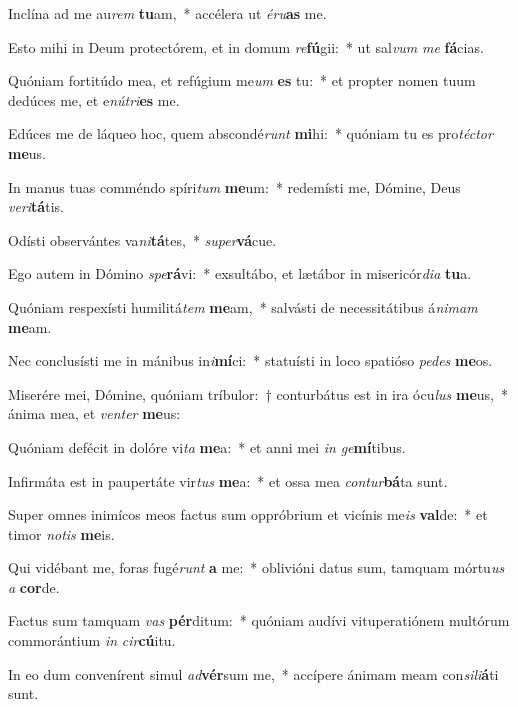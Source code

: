 \item Inclína ad me au\textit{rem} \textbf{tu}am,~* accélera ut \textit{é}\textit{ru}\textbf{as} me.
\item Esto mihi in Deum protectórem, et in domum \textit{re}\textbf{fú}gii:~* ut sal\textit{vum} \textit{me} \textbf{fá}cias.
\item Quóniam fortitúdo mea, et refúgium me\textit{um} \textbf{es} tu:~* et propter nomen tuum dedúces me, et e\textit{nú}\textit{tri}\textbf{es} me.
\item Edúces me de láqueo hoc, quem abscondé\textit{runt} \textbf{mi}hi:~* quóniam tu es pro\textit{téc}\textit{tor} \textbf{me}us.
\item In manus tuas comméndo spíri\textit{tum} \textbf{me}um:~* redemísti me, Dómine, Deus \textit{ve}\textit{ri}\textbf{tá}tis.
\item Odísti observántes va\textit{ni}\textbf{tá}tes,~* \textit{su}\textit{per}\textbf{vá}cue.
\item Ego autem in Dómino \textit{spe}\textbf{rá}vi:~* exsultábo, et lætábor in misericór\textit{di}\textit{a} \textbf{tu}a.
\item Quóniam respexísti humilitá\textit{tem} \textbf{me}am,~* salvásti de necessitátibus á\textit{ni}\textit{mam} \textbf{me}am.
\item Nec conclusísti me in mánibus in\textit{i}\textbf{mí}ci:~* statuísti in loco spatióso \textit{pe}\textit{des} \textbf{me}os.
\item Miserére mei, Dómine, quóniam tríbulor:~† conturbátus est in ira ócu\textit{lus} \textbf{me}us,~* ánima mea, et \textit{ven}\textit{ter} \textbf{me}us:
\item Quóniam defécit in dolóre vi\textit{ta} \textbf{me}a:~* et anni mei \textit{in} \textit{ge}\textbf{mí}tibus.
\item Infirmáta est in paupertáte vir\textit{tus} \textbf{me}a:~* et ossa mea \textit{con}\textit{tur}\textbf{bá}ta sunt.
\item Super omnes inimícos meos factus sum oppróbrium et vicínis me\textit{is} \textbf{val}de:~* et timor \textit{no}\textit{tis} \textbf{me}is.
\item Qui vidébant me, foras fugé\textit{runt} \textbf{a} me:~* oblivióni datus sum, tamquam mórtu\textit{us} \textit{a} \textbf{cor}de.
\item Factus sum tamquam \textit{vas} \textbf{pér}ditum:~* quóniam audívi vituperatiónem multórum commorántium \textit{in} \textit{cir}\textbf{cú}itu.
\item In eo dum convenírent simul \textit{ad}\textbf{vér}sum me,~* accípere ánimam meam con\textit{si}\textit{li}\textbf{á}ti sunt.
